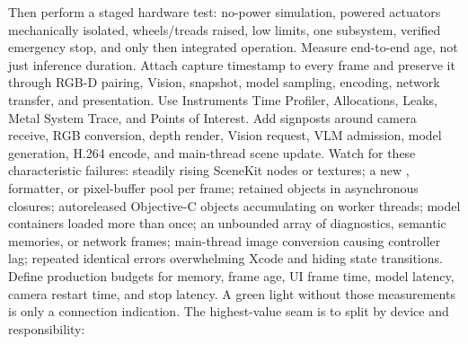 {}Then perform a staged hardware test: no-power simulation, powered actuators mechanically isolated, wheels/treads raised, low limits, one subsystem, verified emergency stop, and only then integrated operation.\markdownRendererInterblockSeparator
{}
\markdownRendererSectionEnd \markdownRendererSectionBegin
{}\markdownRendererInterblockSeparator
{}Measure end-to-end age, not just inference duration. Attach capture timestamp to every frame and preserve it through RGB-D pairing, Vision, snapshot, model sampling, encoding, network transfer, and presentation.\markdownRendererParagraphSeparator
{}Use Instruments Time Profiler, Allocations, Leaks, Metal System Trace, and Points of Interest. Add signposts around camera receive, RGB conversion, depth render, Vision request, VLM admission, model generation, H.264 encode, and main-thread scene update.\markdownRendererParagraphSeparator
{}Watch for these characteristic failures:\markdownRendererInterblockSeparator
{}\markdownRendererUlBegin
\markdownRendererUlItem steadily rising SceneKit nodes or textures;\markdownRendererUlItemEnd 
\markdownRendererUlItem a new , formatter, or pixel-buffer pool per frame;\markdownRendererUlItemEnd 
\markdownRendererUlItem retained  objects in asynchronous closures;\markdownRendererUlItemEnd 
\markdownRendererUlItem autoreleased Objective-C objects accumulating on worker threads;\markdownRendererUlItemEnd 
\markdownRendererUlItem model containers loaded more than once;\markdownRendererUlItemEnd 
\markdownRendererUlItem an unbounded array of diagnostics, semantic memories, or network frames;\markdownRendererUlItemEnd 
\markdownRendererUlItem main-thread image conversion causing controller lag;\markdownRendererUlItemEnd 
\markdownRendererUlItem repeated identical errors overwhelming Xcode and hiding state transitions.\markdownRendererUlItemEnd 
\markdownRendererUlEnd \markdownRendererInterblockSeparator
{}Define production budgets for memory, frame age, UI frame time, model latency, camera restart time, and stop latency. A green light without those measurements is only a connection indication.\markdownRendererInterblockSeparator
{}
\markdownRendererSectionEnd \markdownRendererSectionBegin
{}\markdownRendererInterblockSeparator
{}The highest-value seam is to split  by device and responsibility:\markdownRendererInterblockSeparator
{}\markdownRendererInterblockSeparator
